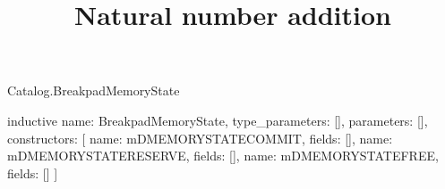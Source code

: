 \begin{lexlean}{Catalog.BreakpadMemoryState}
\title{Natural number addition}
\begin{semanticmodule}
inductive{
  name: BreakpadMemoryState,
  type_parameters: [],
  parameters: [],
  constructors: [
    {name: mDMEMORYSTATECOMMIT, fields: []},
    {name: mDMEMORYSTATERESERVE, fields: []},
    {name: mDMEMORYSTATEFREE, fields: []}
  ]
}
\end{semanticmodule}
\end{lexlean}

